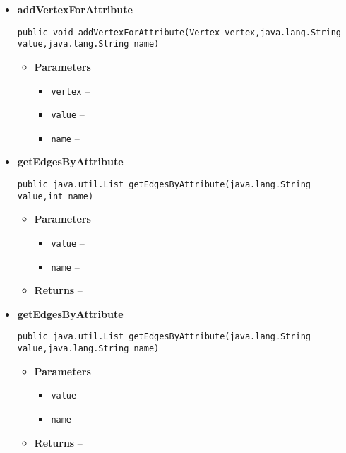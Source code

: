 {{{{{{{{{{{{{{{{{{\begin{itemize}
{\begin{itemize}
{\begin{itemize}
   \item{
\texttt{vertex} -- }
   \item{
\texttt{value} -- }
   \item{
\texttt{name} -- }
  \end{itemize}
}%
\end{itemize}
}%
\item{ 
{\bf  addVertexForAttribute}\\
\begin{lstlisting}[frame=none]
public void addVertexForAttribute(Vertex vertex,java.lang.String value,java.lang.String name)\end{lstlisting} %
\begin{itemize}
\item{
{\bf  Parameters}
  \begin{itemize}
   \item{
\texttt{vertex} -- }
   \item{
\texttt{value} -- }
   \item{
\texttt{name} -- }
  \end{itemize}
}%
\end{itemize}
}%
\item{ 
{\bf  getEdgesByAttribute}\\
\begin{lstlisting}[frame=none]
public java.util.List getEdgesByAttribute(java.lang.String value,int name)\end{lstlisting} %
\begin{itemize}
\item{
{\bf  Parameters}
  \begin{itemize}
   \item{
\texttt{value} -- }
   \item{
\texttt{name} -- }
  \end{itemize}
}%
\item{{\bf  Returns} -- 
 
}%
\end{itemize}
}%
\item{ 
{\bf  getEdgesByAttribute}\\
\begin{lstlisting}[frame=none]
public java.util.List getEdgesByAttribute(java.lang.String value,java.lang.String name)\end{lstlisting} %
\begin{itemize}
\item{
{\bf  Parameters}
  \begin{itemize}
   \item{
\texttt{value} -- }
   \item{
\texttt{name} -- }
  \end{itemize}
}%
\item{{\bf  Returns} -- 
 
}
\end{itemize}}
\end{itemize}}}}}}}}}}}}}}}}}}}

